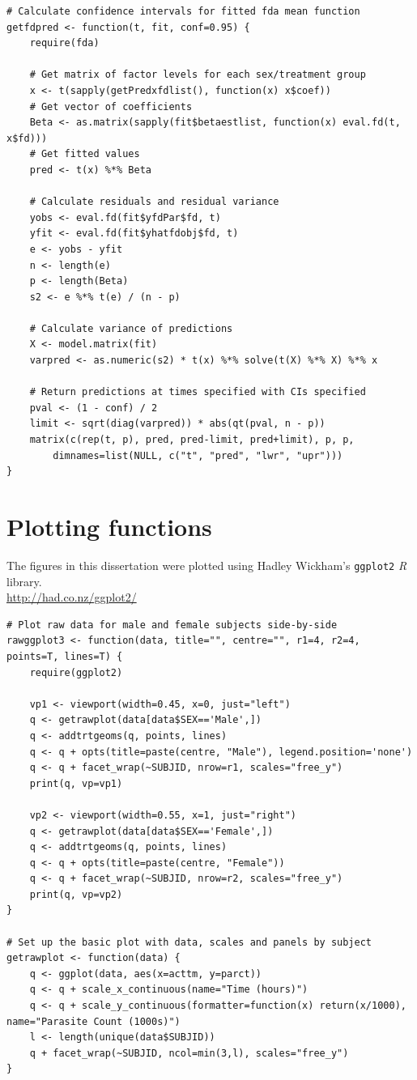 \begin{singlespace}
\begin{lstlisting}[caption=Functions to calculate fda regression standardized residuals and confidence intervals for fitted values,label=R:fdaresid]
# Calculate confidence intervals for fitted fda mean function
getfdpred <- function(t, fit, conf=0.95) {
	require(fda)

	# Get matrix of factor levels for each sex/treatment group
	x <- t(sapply(getPredxfdlist(), function(x) x$coef))
	# Get vector of coefficients
	Beta <- as.matrix(sapply(fit$betaestlist, function(x) eval.fd(t, x$fd)))
	# Get fitted values
	pred <- t(x) %*% Beta

	# Calculate residuals and residual variance
	yobs <- eval.fd(fit$yfdPar$fd, t)
	yfit <- eval.fd(fit$yhatfdobj$fd, t)
	e <- yobs - yfit
	n <- length(e)
	p <- length(Beta)
	s2 <- e %*% t(e) / (n - p)

	# Calculate variance of predictions
	X <- model.matrix(fit)
	varpred <- as.numeric(s2) * t(x) %*% solve(t(X) %*% X) %*% x

	# Return predictions at times specified with CIs specified
	pval <- (1 - conf) / 2
	limit <- sqrt(diag(varpred)) * abs(qt(pval, n - p))
	matrix(c(rep(t, p), pred, pred-limit, pred+limit), p, p,
		dimnames=list(NULL, c("t", "pred", "lwr", "upr")))
}
\end{lstlisting}

\section{Plotting functions}\label{R:plot}
The figures in this dissertation were plotted using Hadley Wickham's \texttt{ggplot2} \emph{R} library.\\
\url{http://had.co.nz/ggplot2/}
\begin{lstlisting}[caption=Plot raw count data for male and female subjects side-by-side,label=R:rawggplot]
# Plot raw data for male and female subjects side-by-side
rawggplot3 <- function(data, title="", centre="", r1=4, r2=4, points=T, lines=T) {
	require(ggplot2)

	vp1 <- viewport(width=0.45, x=0, just="left")
	q <- getrawplot(data[data$SEX=='Male',])
	q <- addtrtgeoms(q, points, lines)
	q <- q + opts(title=paste(centre, "Male"), legend.position='none')
	q <- q + facet_wrap(~SUBJID, nrow=r1, scales="free_y")
	print(q, vp=vp1)

	vp2 <- viewport(width=0.55, x=1, just="right")
	q <- getrawplot(data[data$SEX=='Female',])
	q <- addtrtgeoms(q, points, lines)
	q <- q + opts(title=paste(centre, "Female"))
	q <- q + facet_wrap(~SUBJID, nrow=r2, scales="free_y")
	print(q, vp=vp2)
}

# Set up the basic plot with data, scales and panels by subject
getrawplot <- function(data) {
	q <- ggplot(data, aes(x=acttm, y=parct))
	q <- q + scale_x_continuous(name="Time (hours)")
	q <- q + scale_y_continuous(formatter=function(x) return(x/1000), name="Parasite Count (1000s)")
	l <- length(unique(data$SUBJID))
	q + facet_wrap(~SUBJID, ncol=min(3,l), scales="free_y")
}


\end{lstlisting}
\end{singlespace}
